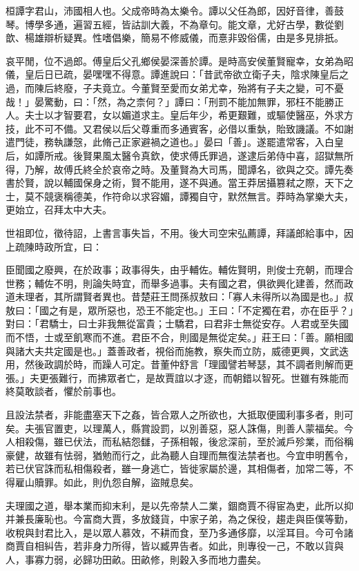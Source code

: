 
\begin{pinyinscope}
桓譚字君山，沛國相人也。父成帝時為太樂令。譚以父任為郎，因好音律，善鼓琴。博學多通，遍習五經，皆詁訓大義，不為章句。能文章，尤好古學，數從劉歆、楊雄辯析疑異。性嗜倡樂，簡易不修威儀，而憙非毀俗儒，由是多見排扺。

哀平閒，位不過郎。傅皇后父孔鄉侯晏深善於譚。是時高安侯董賢寵幸，女弟為昭儀，皇后日已疏，晏嘿嘿不得意。譚進說曰：「昔武帝欲立衛子夫，陰求陳皇后之過，而陳后終廢，子夫竟立。今董賢至愛而女弟尤幸，殆將有子夫之變，可不憂哉！」晏驚動，曰：「然，為之柰何？」譚曰：「刑罰不能加無罪，邪枉不能勝正人。夫士以才智要君，女以媚道求主。皇后年少，希更艱難，或驅使醫巫，外求方技，此不可不備。又君侯以后父尊重而多通賓客，必借以重埶，貽致譏議。不如謝遣門徒，務執謙愨，此脩己正家避禍之道也。」晏曰「善」。遂罷遣常客，入白皇后，如譚所戒。後賢果風太醫令真欽，使求傅氏罪過，遂逮后弟侍中喜，詔獄無所得，乃解，故傅氏終全於哀帝之時。及董賢為大司馬，聞譚名，欲與之交。譚先奏書於賢，說以輔國保身之術，賢不能用，遂不與通。當王莽居攝篡弒之際，天下之士，莫不競褒稱德美，作符命以求容媚，譚獨自守，默然無言。莽時為掌樂大夫，更始立，召拜太中大夫。

世祖即位，徵待詔，上書言事失旨，不用。後大司空宋弘薦譚，拜議郎給事中，因上疏陳時政所宜，曰：

臣聞國之廢興，在於政事；政事得失，由乎輔佐。輔佐賢明，則俊士充朝，而理合世務；輔佐不明，則論失時宜，而舉多過事。夫有國之君，俱欲興化建善，然而政道未理者，其所謂賢者異也。昔楚莊王問孫叔敖曰：「寡人未得所以為國是也。」叔敖曰：「國之有是，眾所惡也，恐王不能定也。」王曰：「不定獨在君，亦在臣乎？」對曰：「君驕士，曰士非我無從富貴；士驕君，曰君非士無從安存。人君或至失國而不悟，士或至飢寒而不進。君臣不合，則國是無從定矣。」莊王曰：「善。願相國與諸大夫共定國是也。」蓋善政者，視俗而施教，察失而立防，威德更興，文武迭用，然後政調於時，而躁人可定。昔董仲舒言「理國譬若琴瑟，其不調者則解而更張。」夫更張難行，而拂眾者亡，是故賈誼以才逐，而朝錯以智死。世雖有殊能而終莫敢談者，懼於前事也。

且設法禁者，非能盡塞天下之姦，皆合眾人之所欲也，大抵取便國利事多者，則可矣。夫張官置吏，以理萬人，縣賞設罰，以別善惡，惡人誅傷，則善人蒙福矣。今人相殺傷，雖已伏法，而私結怨讎，子孫相報，後忿深前，至於滅戶殄業，而俗稱豪健，故雖有怯弱，猶勉而行之，此為聽人自理而無復法禁者也。今宜申明舊令，若已伏官誅而私相傷殺者，雖一身逃亡，皆徙家屬於邊，其相傷者，加常二等，不得雇山贖罪。如此，則仇怨自解，盜賊息矣。

夫理國之道，舉本業而抑末利，是以先帝禁人二業，錮商賈不得宦為吏，此所以抑并兼長廉恥也。今富商大賈，多放錢貨，中家子弟，為之保役，趨走與臣僕等勤，收稅與封君比入，是以眾人慕效，不耕而食，至乃多通侈靡，以淫耳目。今可令諸商賈自相糾告，若非身力所得，皆以臧畀告者。如此，則專役一己，不敢以貨與人，事寡力弱，必歸功田畝。田畝修，則穀入多而地力盡矣。


\end{pinyinscope}
